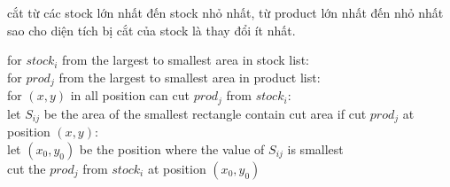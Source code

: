\documentclass[a4paper]{article}
\begin{document}
	
	cắt từ các stock lớn nhất đến stock nhỏ nhất, từ product lớn nhất đến nhỏ nhất sao cho diện tích bị cắt của stock là thay đổi ít nhất.
	\begin{mdframed}[backgroundcolor=black!10]
		for $stock_i$ from the largest to smallest area in stock list:\\
		\hspace*{0.5cm}for $prod_j$ from the largest to smallest area in product list:\\
		\hspace*{1cm} for $(x,y)$ in all position can cut $prod_j$ from $stock_i$:\\
		\hspace*{1.5cm} let $S_{ij}$ be the area of the smallest rectangle contain cut area if cut $prod_j$ at position $(x,y)$:\\
		\hspace*{1cm} let $(x_{0},y_{0})$ be the position where the value of $S_{ij}$ is smallest\\
		\hspace*{1cm} cut the $prod_j$ from $stock_i$ at position $(x_{0},y_{0})$\\
		
	\end{mdframed}
	
\end{document}
